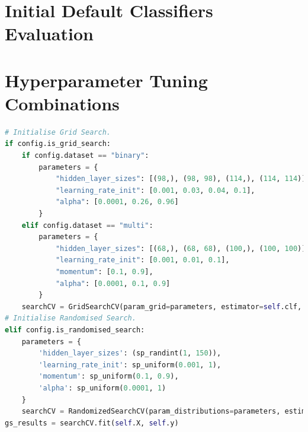\documentclass[letterpaper,12pt]{article}
\begin{document}
\begin{appendices}

\clearpage






\clearpage
\section{Initial Default Classifiers Evaluation}
\label{sec:appendix-initial-default-classifiers}





\clearpage
\section{Hyperparameter Tuning Combinations}
\label{sec:appendix-randomised-grid-search}

\begin{lstlisting}[language=Python]
# Initialise Grid Search.
if config.is_grid_search:
    if config.dataset == "binary":
        parameters = {
            "hidden_layer_sizes": [(98,), (98, 98), (114,), (114, 114)],
            "learning_rate_init": [0.001, 0.03, 0.04, 0.1],
            "alpha": [0.0001, 0.26, 0.96]
        }
    elif config.dataset == "multi":
        parameters = {
            "hidden_layer_sizes": [(68,), (68, 68), (100,), (100, 100)],
            "learning_rate_init": [0.001, 0.01, 0.1],
            "momentum": [0.1, 0.9],
            "alpha": [0.0001, 0.1, 0.9]
        }
    searchCV = GridSearchCV(param_grid=parameters, estimator=self.clf, cv=self.folds, scoring=scoring)
# Initialise Randomised Search.
elif config.is_randomised_search:
    parameters = {
        'hidden_layer_sizes': (sp_randint(1, 150)),
        'learning_rate_init': sp_uniform(0.001, 1),
        'momentum': sp_uniform(0.1, 0.9),
        'alpha': sp_uniform(0.0001, 1)
    }
    searchCV = RandomizedSearchCV(param_distributions=parameters, estimator=self.clf, n_iter=100, cv=self.folds, scoring=scoring)
gs_results = searchCV.fit(self.X, self.y)
\end{lstlisting}

\end{appendices}
\end{document}
